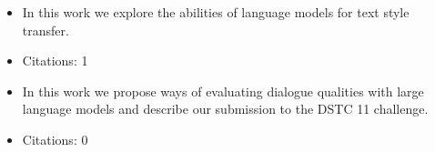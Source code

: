 \noindent{}
\begin{itemize}[noitemsep,topsep=0pt]

\item In this work we explore the abilities of language models for text style transfer.
\item Citations: 1

\end{itemize}\vspace{.5\baselineskip}

\noindent{}
\begin{itemize}[noitemsep,topsep=0pt]

\item In this work we propose ways of evaluating dialogue qualities with large language models and describe our submission to the DSTC 11 challenge.
\item Citations: 0

\end{itemize}\vspace{.5\baselineskip}